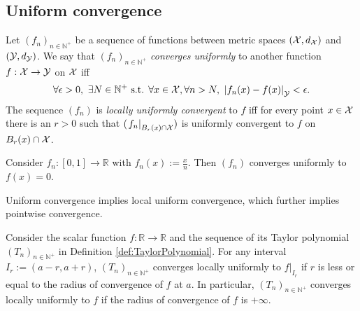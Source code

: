 \subsection{Uniform convergence} %
\label{sec:uniformConvergence}

\begin{defn}
  \label{def:uniformConvergence}
  Let $(f_n)_{n\in\mathbb{N}^+}$ be a sequence of functions
   between metric spaces $({\cal X}, d_{{\cal X}})$
   and $({\cal Y}, d_{{\cal Y}})$.
  We say that $(f_n)_{n\in\mathbb{N}^+}$ \emph{converges uniformly}
  to another function $f:{\cal X}\rightarrow{\cal Y}$
  on ${\cal X}$ iff
   \begin{equation}
     \label{eq:uniformConvergence}
     \forall \epsilon>0,\ 
     \exists N\in \mathbb{N}^+ \text{ s.t. }
     \forall x\in {\cal X}, \forall n>N, \ 
     \left|f_n(x)- f(x)\right|_{{\cal Y}} < \epsilon.
   \end{equation}
  The sequence $(f_n)$ is \emph{locally uniformly convergent} to $f$
   iff for every point $x\in {\cal X}$
   there is an $r>0$
   such that $(\left. f_n\right|_{B_r(x)\cap {\cal X}})$ is
   uniformly convergent to $f$ on $B_r(x)\cap {\cal X}$.
\end{defn}

\begin{exm}
  Consider $f_n:[0,1]\rightarrow \mathbb{R}$
   with $f_n(x):=\frac{x}{n}$.
  Then $(f_n)$ converges uniformly to $f(x)=0$.
\end{exm}

\begin{thm}
  \label{thm:funcConvergenceRelations}
  Uniform convergence implies local uniform convergence,
  which further implies pointwise convergence.
\end{thm}

\begin{exm}
  \label{exm:uniformConvOfTaylorSeries}
  Consider the scalar function $f:\mathbb{R}\rightarrow\mathbb{R}$
   and the sequence of its Taylor polynomial
   $(T_n)_{n\in\mathbb{N}^+}$ in Definition \ref{def:TaylorPolynomial}.
  For any interval \mbox{$I_r:=(a-r,a+r)$},
  $(T_n)_{n\in\mathbb{N}^+}$ converges locally uniformly
  to $f|_{I_r}$ if $r$ is less or equal to the radius of convergence
  of $f$ at $a$.
  In particular,
  $(T_n)_{n\in\mathbb{N}^+}$ converges locally uniformly to $f$
  if the radius of convergence of $f$ is $+\infty$.
\end{exm}

